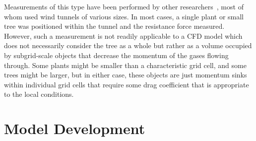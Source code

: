 \documentclass[12pt]{article}
\begin{document}
Measurements of this type have been performed by other researchers~\cite{Cao2012,Jalonen2014,Mayhead1973,Gillies2002,Ishikawa2006}, most of whom used wind tunnels of various sizes. In most cases, a single plant or small tree was positioned within the tunnel and the resistance force measured. However, such a measurement is not readily applicable to a CFD model which does not necessarily consider the tree as a whole but rather as a volume occupied by subgrid-scale objects that decrease the momentum of the gases flowing through. Some plants might be smaller than a characteristic grid cell, and some trees might be larger, but in either case, these objects are just momentum sinks within individual grid cells that require some drag coefficient that is appropriate to the local conditions.


\section{Model Development}
\label{ssec:headingscap}
\end{document}
